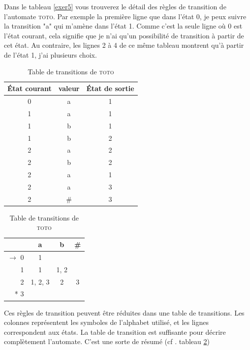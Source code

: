  Dans le tableau \ref{exer5} vous trouverez le détail des règles de transition de l'automate \textsc{toto}. Par exemple la première ligne que dans l'état 0, je peux suivre la transition "a" qui m'amène dans l'état 1. Comme c'est la seule ligne où 0 est l'état courant, cela signifie que je n'ai qu'un possibilité de transition à partir de cet état. Au contraire, les lignes 2 à 4 de ce même tableau montrent qu'à partir de l'état 1, j'ai plusieurs choix.
\begin{small}
\begin{table}[h]
\centering
\begin{subtable}{.6\textwidth}

\begin{tabular}{|c|c|c|}
\hline
État courant&valeur&\'Etat de sortie\\
\hline
0	&a	&1\\
\hline
1	&a	&1\\
\hline
1	&b	&1\\
\hline
1	&b	&2\\
\hline
2	&a	&2\\
\hline
2	&b	&2\\
\hline
2	&a	&1\\
\hline
2	&a	&3\\
\hline
2	&\#	&3\\
\hline
\end{tabular}
\caption{Règles de transition de \textsc{toto} \label{exer5}}
\end{subtable}%
\begin{subtable}{.3\textwidth}
\centering
\begin{tabular}{|r|c|c|c|}
\hline
~		&a	&b	&\#\\
\hline
$\rightarrow$ 0	&1	&~	&~\\
\hline
1		&1	&1, 2	&~\\
\hline
2		&1, 2, 3&2	&3\\
\hline
* 3		&	&	&\\
\hline
\end{tabular}
\caption{Table de transitions de \textsc{toto} \label{exer5b}}
\end{subtable}
\end{table}
\end{small}

 Ces règles de transition peuvent être réduites dans une table de transitions. Les colonnes représentent les symboles de l'alphabet utilisé, et les lignes correspondent aux états. La table de transition est suffisante pour décrire complètement l'automate. C'est une sorte de résumé (cf . tableau  \ref{exer5b})


